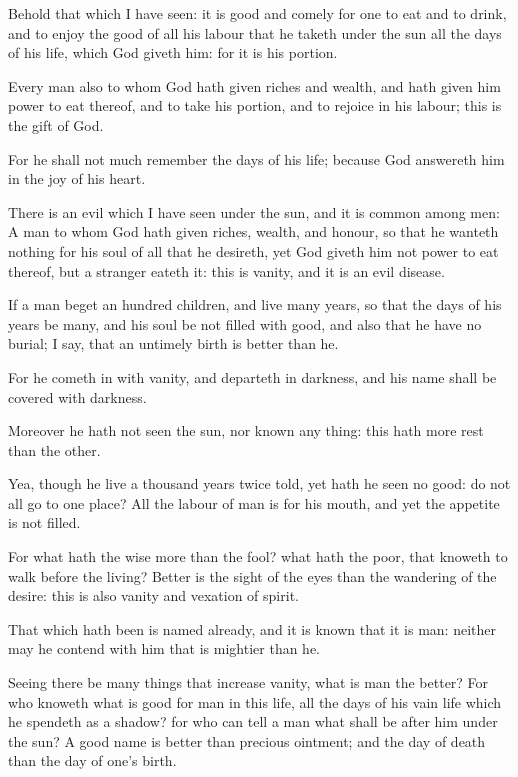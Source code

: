 \Verse Behold that which I have seen: it is good and comely for one to eat and to drink, and to enjoy the good of all his labour that he taketh under the sun all the days of his life, which God giveth him: for it is his portion.

\Verse Every man also to whom God hath given riches and wealth, and hath given him power to eat thereof, and to take his portion, and to rejoice in his labour; this is the gift of God.

\Verse For he shall not much remember the days of his life; because God answereth him in the joy of his heart.


\Chapter
\Verse There is an evil which I have seen under the sun, and it is common among men: \Verse A man to whom God hath given riches, wealth, and honour, so that he wanteth nothing for his soul of all that he desireth, yet God giveth him not power to eat thereof, but a stranger eateth it: this is vanity, and it is an evil disease.

\Verse If a man beget an hundred children, and live many years, so that the days of his years be many, and his soul be not filled with good, and also that he have no burial; I say, that an untimely birth is better than he.

\Verse For he cometh in with vanity, and departeth in darkness, and his name shall be covered with darkness.

\Verse Moreover he hath not seen the sun, nor known any thing: this hath more rest than the other.

\Verse Yea, though he live a thousand years twice told, yet hath he seen no good: do not all go to one place?  \Verse All the labour of man is for his mouth, and yet the appetite is not filled.

\Verse For what hath the wise more than the fool? what hath the poor, that knoweth to walk before the living?  \Verse Better is the sight of the eyes than the wandering of the desire: this is also vanity and vexation of spirit.

\Verse That which hath been is named already, and it is known that it is man: neither may he contend with him that is mightier than he.

\Verse Seeing there be many things that increase vanity, what is man the better?  \Verse For who knoweth what is good for man in this life, all the days of his vain life which he spendeth as a shadow? for who can tell a man what shall be after him under the sun?  
\Chapter
\Verse A good name is better than precious ointment; and the day of death than the day of one's birth.

